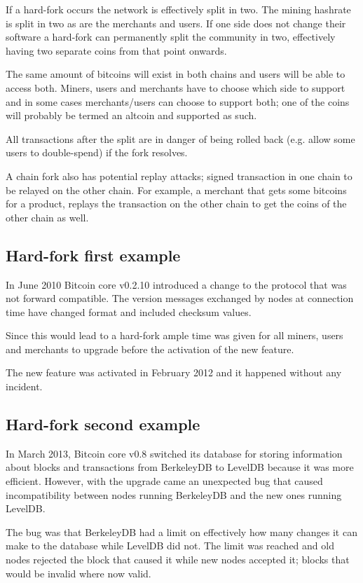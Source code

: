 If a hard-fork occurs the network is effectively split in two. The mining hashrate is split in two as are the merchants and users. If one side does not change their software a hard-fork can permanently split the community in two, effectively having two separate coins from that point onwards.

The same amount of bitcoins will exist in both chains and users will be able to access both. Miners, users and merchants have to choose which side to support and in some cases merchants/users can choose to support both; one of the coins will probably be termed an altcoin and supported as such.

All transactions after the split are in danger of being rolled back (e.g. allow some users to double-spend) if the fork resolves. 

A chain fork also has potential replay attacks; signed transaction in one chain to be relayed on the other chain. For example, a merchant that gets some bitcoins for a product, replays the transaction on the other chain to get the coins of the other chain as well.

\subsection*{Hard-fork first example}
In June 2010 Bitcoin core v0.2.10 introduced a change to the protocol that was not forward compatible. The version messages exchanged by nodes at connection time have changed format and included checksum values.

Since this would lead to a hard-fork ample time was given for all miners, users and merchants to upgrade before the activation of the new feature.

The new feature was activated in February 2012 and it happened without any incident.

\subsection*{Hard-fork second example}
In March 2013, Bitcoin core v0.8 switched its database for storing information about blocks and transactions from BerkeleyDB to LevelDB because it was more efficient. However, with the upgrade came an unexpected bug that caused incompatibility between nodes running BerkeleyDB and the new ones running LevelDB.

The bug was that BerkeleyDB had a limit on effectively how many changes it can make to the database while LevelDB did not. The limit was reached and old nodes rejected the block that caused it while new nodes accepted it; blocks that would be invalid where now valid.

